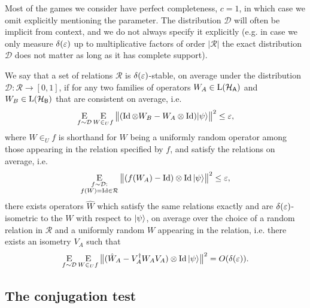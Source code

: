 Most of the games we consider have perfect completeness, $c=1$, in which case we  omit explicitly mentioning the parameter. 
 The distribution $\mathcal{D}$ will often be implicit from context, and we do not always specify it explicitly (e.g. in case we only measure $\delta(\varepsilon)$ up to multiplicative factors of order $|\mathcal{R}|$ the exact distribution $\mathcal{D}$ does not matter as long as it has complete support). 

\begin{definition}
We say that a set of relations $\mathcal{R}$ is $\delta(\varepsilon)$-stable, on average under the distribution $\mathcal{D}:\mathcal{R}\to[0,1]$, if for any two families of operators $W_A\in\mathrm{L}(\mathcal{H}_{\textsf{A}})$ and  $W_B\in\mathrm{L}(\mathcal{H}_{\textsf{B}})$ that are consistent on average, i.e. 
$$\mathop{\textsc{E}}_{f \sim\mathcal{D}} \mathop{\textsc{E}}_{W \in_U f} \big\| (\mathop{\rm Id}\nolimits\otimes W_B - W_A \otimes \mathop{\rm Id}\nolimits)|\psi\rangle\big\|^2\leq \varepsilon,$$
where $W \in_U f$ is shorthand for $W$ being a uniformly random operator among those appearing in the relation specified by $f$,
and satisfy the relations on average, i.e. 
$$\mathop{\textsc{E}}_{\substack{f\sim\mathcal{D}:\\f(W)=\mathop{\rm Id}\nolimits \in\mathcal{R}}} \big\|  (f(W_A)- \mathop{\rm Id}\nolimits) \otimes \mathop{\rm Id}\nolimits |\psi\rangle\big\|^2 \leq \varepsilon,$$
  there exists operators $\hat{W}$ which satisfy the same relations exactly and are $\delta(\varepsilon)$-isometric to the $W$ with respect to $|\psi\rangle$, on average over the choice of a random relation in $\mathcal{R}$ and a uniformly random $W$ appearing in the relation, i.e. there exists an isometry $V_A$ such that 
  \begin{equation}
    \mathop{\textsc{E}}_{f \sim\mathcal{D}} \mathop{\textsc{E}}_{W \in_U f} \big\|( \hat{W}_A-V_A^\dagger W_AV_A)\otimes \mathop{\rm Id}\nolimits |\psi\rangle\big\|^2=O(\delta(\varepsilon)).\nonumber
  \end{equation}
	\end{definition}


\subsection{The conjugation test}
\label{sec:conj-test}

